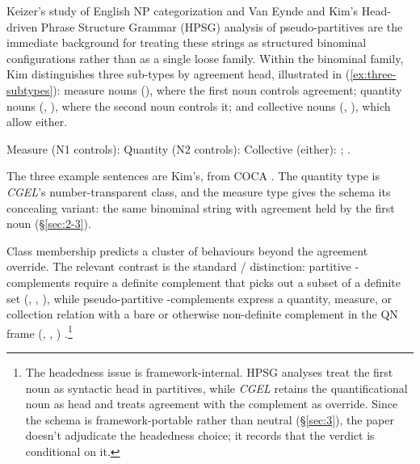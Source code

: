 Keizer's \autocite*{keizer-2007-english-noun-phrase} study of English NP categorization and Van Eynde and Kim's \autocite*{van-eynde-kim-2023-pseudo-partitives} Head-driven Phrase Structure Grammar (HPSG) analysis of pseudo-partitives are the immediate background for treating these strings as structured binominal configurations rather than as a single loose family. Within the binominal family, Kim \autocite*[98--103]{kim-2026-form-function} distinguishes three sub-types by agreement head, illustrated in (\ref{ex:three-subtypes}): measure nouns (), where the first noun controls agreement; quantity nouns (, ), where the second noun controls it; and collective nouns (, ), which allow either.

\ea\label{ex:three-subtypes}
\ea Measure (N1 controls): 
\ex Quantity (N2 controls): 
\ex Collective (either): ; .
\z
\z

The three example sentences are Kim's, from COCA \autocite[99--102]{kim-2026-form-function}. The quantity type is \textit{CGEL}'s number-transparent class, and the measure type gives the schema its concealing variant: the same binominal string with agreement held by the first noun (§\ref{sec:2-3}).

Class membership predicts a cluster of behaviours beyond the agreement override. The relevant contrast is the standard  /  distinction: partitive -complements require a definite complement that picks out a subset of a definite set (, , ), while pseudo-partitive -complements express a quantity, measure, or collection relation with a bare or otherwise non-definite complement in the QN frame (, , ) \autocite{selkirk-1977-noun-phrase-structure,stickney-2007-pseudopartitive-partitive,kim-michaelis-2020-syntactic-constructions,van-eynde-kim-2023-pseudo-partitives}.\footnote{The headedness issue is framework-internal. HPSG analyses treat the first noun as syntactic head in  partitives, while \textit{CGEL} retains the quantificational noun as head and treats agreement with the complement as override. Since the schema is framework-portable rather than neutral (§\ref{sec:3}), the paper doesn't adjudicate the headedness choice; it records that the verdict is conditional on it.}


